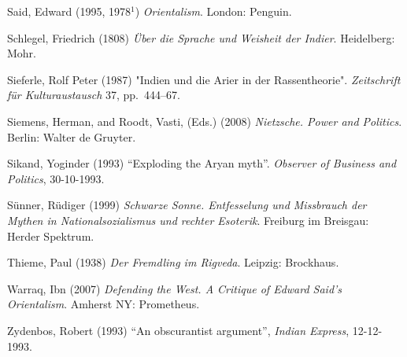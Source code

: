 \begin{thebibliography}{99}
Said, Edward (1995, 1978$^1$) {\sl Orientalism}. London: Penguin.

Schlegel, Friedrich (1808) {\sl Über die Sprache und Weisheit der Indier}. Heidelberg: Mohr.

Sieferle, Rolf Peter (1987) "Indien und die Arier in der Rassentheorie". {\sl Zeitschrift für Kulturaustausch} 37, pp.~444--67.

Siemens, Herman, and Roodt, Vasti, (Eds.) (2008) {\sl Nietzsche. Power and Politics}. Berlin: Walter de Gruyter.

Sikand, Yoginder (1993) “Exploding the Aryan myth”. {\sl Observer of Business and Politics}, 30-10-1993.

Sünner, Rüdiger (1999) {\sl Schwarze Sonne. Entfesselung und Missbrauch der Mythen in Nationalsozialismus und rechter Esoterik}. Freiburg im Breisgau: Herder Spektrum.

Thieme, Paul (1938) {\sl Der Fremdling im Rigveda}. Leipzig: Brockhaus.

Warraq, Ibn (2007) {\sl Defending the West. A Critique of Edward Said’s Orientalism}. Amherst NY: Prometheus.

Zydenbos, Robert (1993) “An obscurantist argument”, {\sl Indian Express}, 12-12-1993.
\end{thebibliography}
